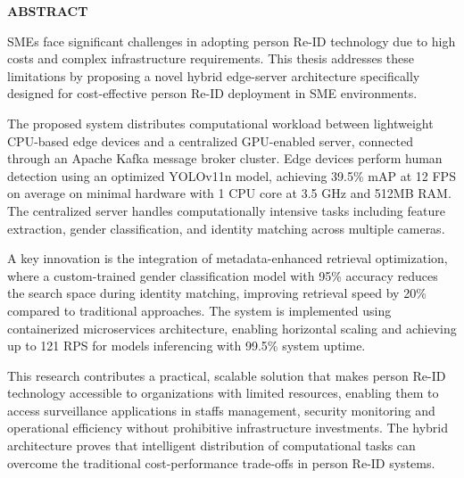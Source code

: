 \documentclass[../main.tex]{subfiles}
\begin{document}
\begin{center}
    \Large{\textbf{ABSTRACT}}\\
\end{center}
\vspace{1cm}

SMEs face significant challenges in adopting person Re-ID technology due to high costs and complex infrastructure requirements. This thesis addresses these limitations by proposing a novel hybrid edge-server architecture specifically designed for cost-effective person Re-ID deployment in SME environments.

The proposed system distributes computational workload between lightweight CPU-based edge devices and a centralized GPU-enabled server, connected through an Apache Kafka message broker cluster. Edge devices perform human detection using an optimized YOLOv11n model, achieving 39.5\% mAP at 12 FPS on average on minimal hardware with 1 CPU core at 3.5 GHz and 512MB RAM. The centralized server handles computationally intensive tasks including feature extraction, gender classification, and identity matching across multiple cameras.

A key innovation is the integration of metadata-enhanced retrieval optimization, where a custom-trained gender classification model with 95\% accuracy reduces the search space during identity matching, improving retrieval speed by 20\% compared to traditional approaches. The system is implemented using containerized microservices architecture, enabling horizontal scaling and achieving up to 121 RPS for models inferencing with 99.5\% system uptime.

This research contributes a practical, scalable solution that makes person Re-ID technology accessible to organizations with limited resources, enabling them to access surveillance applications in staffs management, security monitoring and operational efficiency without prohibitive infrastructure investments. The hybrid architecture proves that intelligent distribution of computational tasks can overcome the traditional cost-performance trade-offs in person Re-ID systems.
\end{document}
